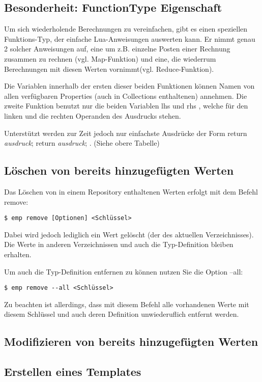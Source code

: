 \subsection{Besonderheit: FunctionType Eigenschaft}
Um sich wiederholende Berechnungen zu vereinfachen, gibt es einen speziellen Funktions-Typ, der einfache Lua-Anweisungen auswerten kann. Er nimmt genau 2 solcher Anweisungen auf, eine um z.B. einzelne Posten einer Rechnung zusammen zu rechnen (vgl. \grqq Map-Funktion\grqq) und eine, die wiederrum Berechnungen mit diesen Werten vornimmt(vgl. \grqq Reduce-Funktion\grqq).

Die Variablen innerhalb der ersten dieser beiden Funktionen können Namen von allen verfügbaren Properties (auch in Collections enthaltenen) annehmen. Die zweite Funktion benutzt nur die beiden Variablen \grqq lhs \grqq und \grqq rhs \grqq , welche für den linken und die rechten Operanden des Ausdrucks stehen.

Unterstützt werden zur Zeit jedoch nur einfachste Ausdrücke der Form \grqq return \emph{ausdruck}; return \emph{ausdruck}; \grqq. (Siehe obere Tabelle)


\subsection{Löschen von bereits hinzugefügten Werten}
Das Löschen von in einem Repository enthaltenen Werten erfolgt mit dem Befehl remove:
\begin{lstlisting}[style=Bash]
$ emp remove [Optionen] <Schlüssel>
\end{lstlisting}

Dabei wird jedoch lediglich ein Wert gelöscht (der des aktuellen Verzeichnisses). Die Werte in anderen Verzeichnissen und auch die Typ-Definition bleiben erhalten.

Um auch die Typ-Definition entfernen zu können nutzen Sie die Option --all:
\begin{lstlisting}[style=Bash]
$ emp remove --all <Schlüssel>
\end{lstlisting}
Zu beachten ist allerdings, dass mit diesem Befehl alle vorhandenen Werte mit diesem Schlüssel und auch deren Definition unwiederuflich entfernt werden.

\subsection{Modifizieren von bereits hinzugefügten Werten}
\subsection{Erstellen eines Templates}

